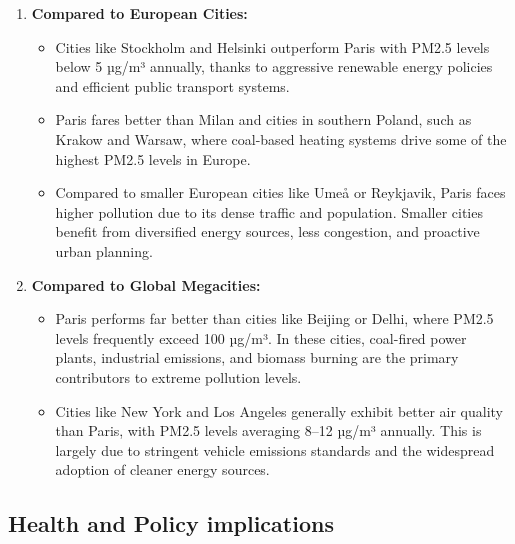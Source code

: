 \documentclass{modeleRapport}
\begin{document}
\begin{enumerate}
    \item \textbf{Compared to European Cities:}
    \begin{itemize}
        \item Cities like Stockholm and Helsinki outperform Paris with PM2.5 levels below 5 µg/m³ annually, 
        thanks to aggressive renewable energy policies and efficient public transport systems.
        \item Paris fares better than Milan and cities in southern Poland, such as Krakow and Warsaw, 
        where coal-based heating systems drive some of the highest PM2.5 levels in Europe.
        \item Compared to smaller European cities like Umeå or Reykjavik, Paris faces higher pollution due to its 
        dense traffic and population. Smaller cities benefit from diversified energy sources, less congestion, 
        and proactive urban planning.
    \end{itemize}
    \item \textbf{Compared to Global Megacities:}
    \begin{itemize}
        \item Paris performs far better than cities like Beijing or Delhi, where PM2.5 levels frequently 
        exceed 100 µg/m³. In these cities, coal-fired power plants, industrial emissions, and biomass burning 
        are the primary contributors to extreme pollution levels.
        \item Cities like New York and Los Angeles generally exhibit better air quality than Paris, with PM2.5 
        levels averaging 8–12 µg/m³ annually. This is largely due to stringent vehicle emissions standards and 
        the widespread adoption of cleaner energy sources.
    \end{itemize}
\end{enumerate}

\subsection{Health and Policy implications}
\end{document}
